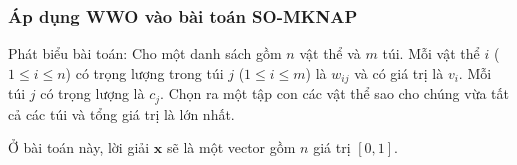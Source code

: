 \begin{frame}
    \frametitle{Áp dụng WWO vào bài toán SO-MKNAP}
    \begin{block}{Phát biểu bài toán:}
        Cho một danh sách gồm $n$ vật thể và $m$ túi. Mỗi vật thể $i$ ($1 \le i \le n$) có trọng lượng trong túi $j$ ($1 \le i \le m$) là $w_{ij}$ và có giá trị là $v_i$. Mỗi túi $j$ có trọng lượng là $c_j$. Chọn ra một tập con các vật thể sao cho chúng vừa tất cả các túi và tổng giá trị là lớn nhất.
    \end{block}
    Ở bài toán này, lời giải $\mathbf{x}$ sẽ là một vector gồm $n$ giá trị $[0, 1]$. 
\end{frame}